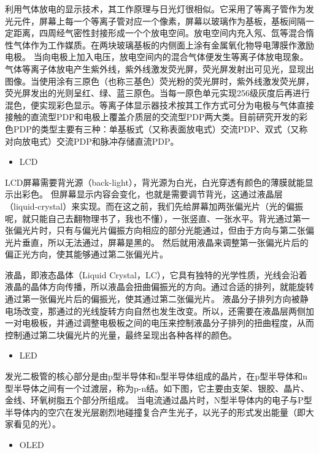 \documentclass[UTF8,a4paper,AutoFakeBold,AutoFakeSlant]{ctexart}
\begin{document}
利用气体放电的显示技术，其工作原理与日光灯很相似。它采用了等离子管作为发光元件，屏幕上每一个等离子管对应一个像素，屏幕以玻璃作为基板，基板间隔一定距离，四周经气密性封接形成一个个放电空间。放电空间内充入氖、氙等混合惰性气体作为工作媒质。在两块玻璃基板的内侧面上涂有金属氧化物导电薄膜作激励电极。 当向电极上加入电压，放电空间内的混合气体便发生等离子体放电现象。气体等离子体放电产生紫外线，紫外线激发荧光屏，荧光屏发射出可见光，显现出图像。当使用涂有三原色（也称三基色）荧光粉的荧光屏时，紫外线激发荧光屏，荧光屏发出的光则呈红、绿、蓝三原色。当每一原色单元实现256级灰度后再进行混色，便实现彩色显示。等离子体显示器技术按其工作方式可分为电极与气体直接接触的直流型PDP和电极上覆盖介质层的交流型PDP两大类。目前研究开发的彩色PDP的类型主要有三种：单基板式（又称表面放电式）交流PDP、双式（又称对向放电式）交流PDP和脉冲存储直流PDP。

\begin{itemize}
  \item LCD
\end{itemize}

LCD屏幕需要背光源（back-light），背光源为白光，白光穿透有颜色的薄膜就能显示出彩色。
但屏幕显示内容会变化，也就是需要调节背光，这通过液晶层（liquid-crystal）来实现。而在这之前，我们先给屏幕加两张偏光片（光的偏振呢，就只能自己去翻物理书了，我也不懂），一张竖直、一张水平。背光通过第一张偏光片时，只有与偏光片偏振方向相应的部分光能通过，但由于方向与第二张偏光片垂直，所以无法通过，屏幕是黑的。
然后就用液晶来调整第一张偏光片后的偏正光方向，使其能够通过第二张偏光片。

液晶，即液态晶体（Liquid Crystal，LC），它具有独特的光学性质，光线会沿着液晶的晶体方向传播，所以液晶会扭曲偏振光的方向。通过合适的排列，就能旋转通过第一张偏光片后的偏振光，使其通过第二张偏光片。
液晶分子排列方向被静电场改变，那通过的光线旋转方向自然也发生改变。所以，还需要在液晶层两侧加一对电极板，并通过调整电极板之间的电压来控制液晶分子排列的扭曲程度，从而控制通过第二块偏光片的光量，最终呈现出各种各样的颜色。

\begin{itemize}
  \item LED
\end{itemize}

发光二极管的核心部分是由p型半导体和n型半导体组成的晶片，在p型半导体和n型半导体之间有一个过渡层，称为p-n结。如下图，它主要由支架、银胶、晶片、金线、环氧树脂五个部分所组成。
当电流通过晶片时，N型半导体内的电子与P型半导体内的空穴在发光层剧烈地碰撞复合产生光子，以光子的形式发出能量（即大家看见的光）。

\begin{itemize}
  \item OLED
\end{itemize}
\end{document}
